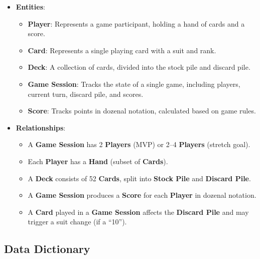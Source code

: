\documentclass[12pt]{article}
\begin{document}
\begin{itemize}
    \item \textbf{Entities}:
    \begin{itemize}
        \item \textbf{Player}: Represents a game participant, holding a hand of cards and a score.
        \item \textbf{Card}: Represents a single playing card with a suit and rank.
        \item \textbf{Deck}: A collection of cards, divided into the stock pile and discard pile.
        \item \textbf{Game Session}: Tracks the state of a single game, including players, current turn, discard pile, and scores.
        \item \textbf{Score}: Tracks points in dozenal notation, calculated based on game rules.
    \end{itemize}
    \item \textbf{Relationships}:
    \begin{itemize}
        \item A \textbf{Game Session} has 2 \textbf{Players} (MVP) or 2--4 \textbf{Players} (stretch goal).
        \item Each \textbf{Player} has a \textbf{Hand} (subset of \textbf{Cards}).
        \item A \textbf{Deck} consists of 52 \textbf{Cards}, split into \textbf{Stock Pile} and \textbf{Discard Pile}.
        \item A \textbf{Game Session} produces a \textbf{Score} for each \textbf{Player} in dozenal notation.
        \item A \textbf{Card} played in a \textbf{Game Session} affects the \textbf{Discard Pile} and may trigger a suit change (if a ``10'').
    \end{itemize}
\end{itemize}

\subsection{Data Dictionary}
\end{document}
